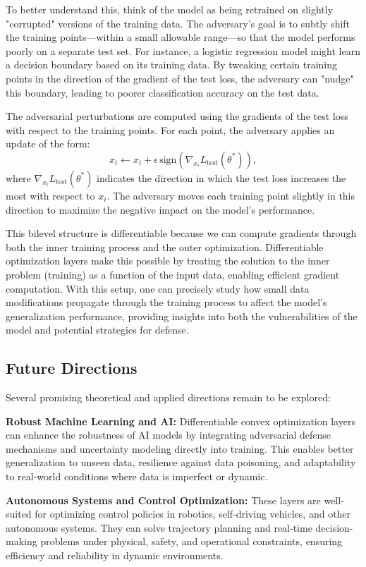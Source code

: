 \documentclass{article}
\begin{document}
To better understand this, think of the model as being retrained on slightly "corrupted" versions of the training data. The adversary's goal is to subtly shift the training points—within a small allowable range—so that the model performs poorly on a separate test set. For instance, a logistic regression model might learn a decision boundary based on its training data. By tweaking certain training points in the direction of the gradient of the test loss, the adversary can "nudge" this boundary, leading to poorer classification accuracy on the test data.

The adversarial perturbations are computed using the gradients of the test loss with respect to the training points. For each point, the adversary applies an update of the form:
\[
x_i \leftarrow x_i + \epsilon \, \text{sign}(\nabla_{x_i} L_{\text{test}}(\theta^*)),
\]
where \(\nabla_{x_i} L_{\text{test}}(\theta^*)\) indicates the direction in which the test loss increases the most with respect to \(x_i\). The adversary moves each training point slightly in this direction to maximize the negative impact on the model's performance.

This bilevel structure is differentiable because we can compute gradients through both the inner training process and the outer optimization. Differentiable optimization layers make this possible by treating the solution to the inner problem (training) as a function of the input data, enabling efficient gradient computation. With this setup, one can precisely study how small data modifications propagate through the training process to affect the model's generalization performance, providing insights into both the vulnerabilities of the model and potential strategies for defense.


\subsection{Future Directions}

Several promising theoretical and applied directions remain to be explored:

\textbf{Robust Machine Learning and AI:}
Differentiable convex optimization layers can enhance the robustness of AI models by integrating adversarial defense mechanisms and uncertainty modeling directly into training. This enables better generalization to unseen data, resilience against data poisoning, and adaptability to real-world conditions where data is imperfect or dynamic.

\textbf{Autonomous Systems and Control Optimization:}
These layers are well-suited for optimizing control policies in robotics, self-driving vehicles, and other autonomous systems. They can solve trajectory planning and real-time decision-making problems under physical, safety, and operational constraints, ensuring efficiency and reliability in dynamic environments.
\end{document}

